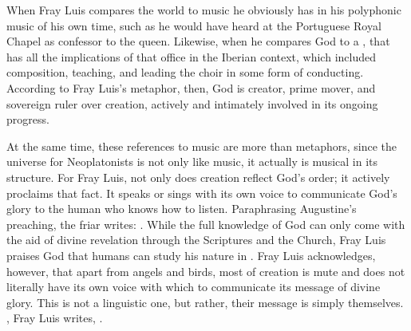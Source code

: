
When Fray Luis compares the world to music  he
obviously has in his  polyphonic music of his own time, such
as he would have heard at the Portuguese Royal Chapel as confessor to the
queen.
Likewise, when he compares God to a , that has all
the implications of that office in the Iberian context, which included
composition, teaching, and leading the choir in some form of conducting.
According to Fray Luis's metaphor, then, God is creator, prime mover, and
sovereign ruler over creation, actively and intimately involved in its ongoing
progress.


At the same time, these references to music are more than metaphors, since the
universe for Neoplatonists is not only like music, it actually is musical in
its structure.
For Fray Luis, not only does creation reflect God's order; it actively
proclaims that fact.
It speaks or sings with its own voice to communicate God's glory to the human
who knows how to listen.
Paraphrasing Augustine's preaching, the friar writes: .%
    \Autocite[185, glossing Augustine's commentary on ]
    {LuisdeGranada:Simbolo} 
While the full knowledge of God can only come with the aid of divine revelation
through the Scriptures and the Church, Fray Luis praises God that humans can
study his nature in .%
    \Autocite[186]{LuisdeGranada:Simbolo}
Fray Luis acknowledges, however, that apart from angels and birds, most of
creation is mute and does not literally have its own voice with which to
communicate its message of divine glory.
This  is not a linguistic one, but rather, their message is
simply themselves.
, Fray Luis writes, .%
    \Autocite[192]{LuisdeGranada:Simbolo}

